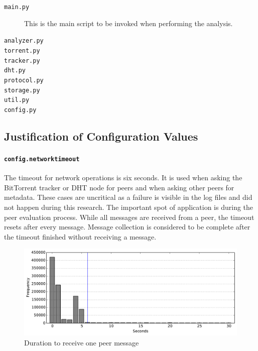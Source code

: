 \documentclass[10pt, a4paper]{scrartcl} %
\renewcommand{\_}{\origunderscore\allowbreak}
\newcommand{\config}[1]{\texttt{config.\allowbreak #1}}
\begin{document}
\begin{description}
  \item[\texttt{main.py}] This is the main script to be invoked when performing the analysis.
  \item[\texttt{analyzer.py}]
  \item[\texttt{torrent.py}]
  \item[\texttt{tracker.py}]
  \item[\texttt{dht.py}]
  \item[\texttt{protocol.py}]
  \item[\texttt{storage.py}]
  \item[\texttt{util.py}]
  \item[\texttt{config.py}]
\end{description}

\subsection{Justification of Configuration Values}
\paragraph{\config{network\_timeout}}
The timeout for network operations is six seconds. It is used when asking the BitTorrent tracker or DHT node for peers and when asking other peers for metadata. These cases are uncritical as a failure is visible in the log files and did not happen during this research. The important spot of application is during the peer evaluation process. While all messages are received from a peer, the timeout resets after every message. Message collection is considered to be complete after the timeout finished without receiving a message.

\begin{figure}
\centering
\includegraphics[width=\textwidth]{2015-08-14_17-46-44_faui1-246_timeout}
\caption{Duration to receive one peer message}
\label{timeout-calibration}
\end{figure}
\end{document}
